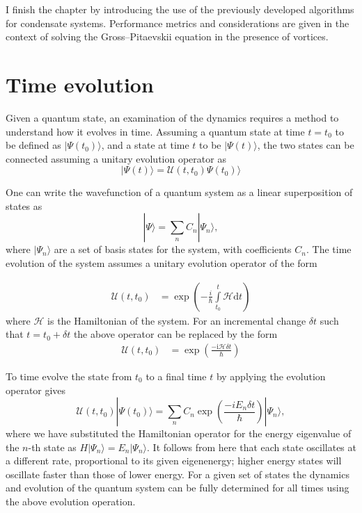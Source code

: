 I finish the chapter by introducing the use of the previously developed algorithms for condensate systems. Performance metrics and considerations are given in the context of solving the Gross--Pitaevskii equation in the presence of vortices.

\section{Time evolution}\label{sec:timeev}
Given a quantum state, an examination of the dynamics requires a method to understand how it evolves in time. Assuming a quantum state at time $t=t_0$ to be defined as $|\Psi(t_0) \rangle$, and a state at time $t$ to be $|\Psi(t) \rangle$, the two states can be connected assuming a unitary evolution operator as
\begin{equation}
    |\Psi(t) \rangle = \mathcal{U}(t,t_0) \Psi(t_0) \rangle
\end{equation}

One can write the wavefunction of a quantum system as a linear superposition of states as
\begin{equation}
    |\Psi \rangle = \displaystyle\sum\limits_{n} C_n |\Psi_n \rangle,
\end{equation}
where $| \Psi_n \rangle$ are a set of basis states for the system, with coefficients $C_n$. The time evolution of the system assumes a unitary evolution operator of the form

\begin{align}
   \mathscr{U}(t,t_0) &= \exp\left(-\frac{i}{\hbar}\displaystyle\int\limits_{t_0}^{t}\mathcal{H}\text{d}t\right)
\end{align}
where $\mathcal{H}$ is the Hamiltonian of the system. For an incremental change $\delta t$ such that $t = t_0 +\delta t$ the above operator can be replaced by the form
\begin{align}\label{eqn:timev_dt}
   \mathscr{U}(t,t_0) &= \exp\left(\frac{-\text{i}\mathcal{H}\delta t}{\hbar}\right)
\end{align}

To time evolve the state from $t_0$ to a final time $t$ by applying the evolution operator gives
\begin{equation}
   \mathscr{U}(t,t_0)|\Psi(t_0) \rangle = \displaystyle\sum\limits_{n} C_n \exp\left(\frac{-i{E_n}\delta t}{\hbar}\right)|\Psi_n \rangle,
\end{equation}
where we have substituted the Hamiltonian operator for the energy eigenvalue of the $n$-th state as $H|\Psi_n \rangle = E_n|\Psi_n \rangle $. It follows from here that each state oscillates at a different rate, proportional to its given eigenenergy; higher energy states will oscillate faster than those of lower energy. For a given set of states the dynamics and evolution of the quantum system can be fully determined for all times using the above evolution operation.

